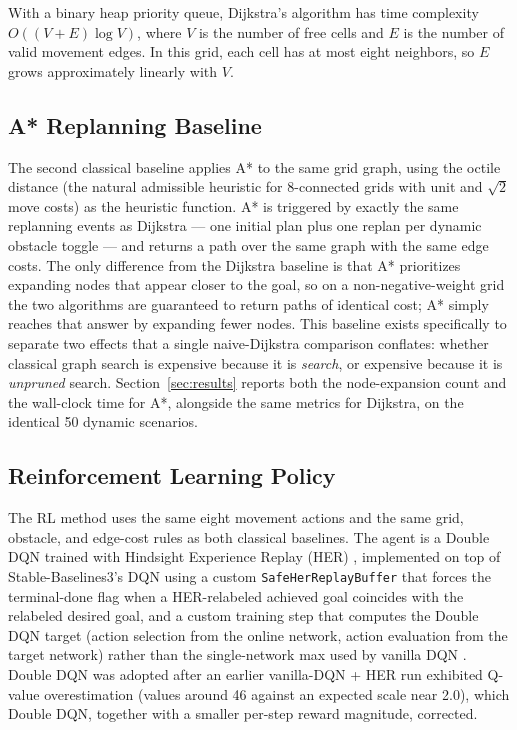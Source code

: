With a binary heap priority queue, Dijkstra's algorithm has time complexity $O((V+E)\log V)$, where $V$ is the number of free cells and $E$ is the number of valid movement edges. In this grid, each cell has at most eight neighbors, so $E$ grows approximately linearly with $V$.

\subsection{A* Replanning Baseline}
\label{sec:astar-baseline}

The second classical baseline applies A* \cite{hart1968astar} to the same grid graph, using the octile distance (the natural admissible heuristic for 8-connected grids with unit and $\sqrt{2}$ move costs) as the heuristic function. A* is triggered by exactly the same replanning events as Dijkstra --- one initial plan plus one replan per dynamic obstacle toggle --- and returns a path over the same graph with the same edge costs. The only difference from the Dijkstra baseline is that A* prioritizes expanding nodes that appear closer to the goal, so on a non-negative-weight grid the two algorithms are guaranteed to return paths of identical cost; A* simply reaches that answer by expanding fewer nodes. This baseline exists specifically to separate two effects that a single naive-Dijkstra comparison conflates: whether classical graph search is expensive because it is \emph{search}, or expensive because it is \emph{unpruned} search. Section~\ref{sec:results} reports both the node-expansion count and the wall-clock time for A*, alongside the same metrics for Dijkstra, on the identical 50 dynamic scenarios.

\subsection{Reinforcement Learning Policy}
\label{sec:rl-policy}

The RL method uses the same eight movement actions and the same grid, obstacle, and edge-cost rules as both classical baselines. The agent is a Double DQN \cite{vanhasselt2016double} trained with Hindsight Experience Replay (HER) \cite{andrychowicz2017her}, implemented on top of Stable-Baselines3's DQN using a custom \texttt{SafeHerReplayBuffer} that forces the terminal-done flag when a HER-relabeled achieved goal coincides with the relabeled desired goal, and a custom training step that computes the Double DQN target (action selection from the online network, action evaluation from the target network) rather than the single-network max used by vanilla DQN \cite{mnih2015human}. Double DQN was adopted after an earlier vanilla-DQN + HER run exhibited Q-value overestimation (values around 46 against an expected scale near 2.0), which Double DQN, together with a smaller per-step reward magnitude, corrected.

